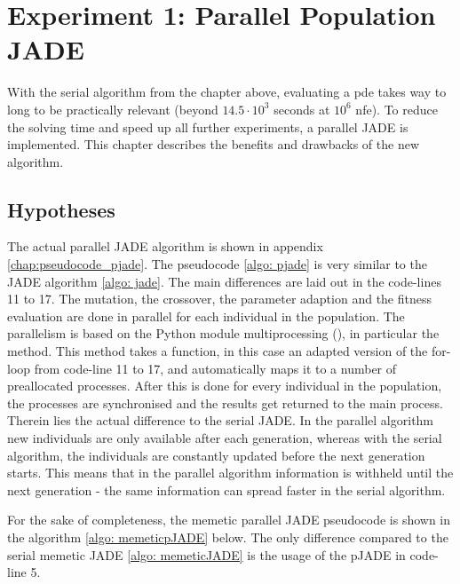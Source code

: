 \documentclass[./\jobname.tex]{subfiles}
\begin{document}
\chapter {Experiment 1: Parallel Population JADE}
\label{chap:experimet_1}

With the serial algorithm from the chapter above, evaluating a \gls{pde} takes way to long to be practically relevant (beyond $14.5 \cdot 10^3$ seconds at $10^6$ \gls{nfe}). To reduce the solving time and speed up all further experiments, a parallel JADE is implemented. This chapter describes the benefits and drawbacks of the new algorithm.  

\section{Hypotheses}
The actual parallel JADE algorithm is shown in appendix \ref{chap:pseudocode_pjade}. The pseudocode \ref{algo: pjade} is very similar to the JADE algorithm \ref{algo: jade}. The main differences are laid out in the code-lines 11 to 17. The mutation, the crossover, the parameter adaption and the fitness evaluation are done in parallel for each individual in the population. The parallelism is based on the Python module multiprocessing (\cite{python_standard_library_multiprocessing_2020}), in particular the  method. This method takes a function, in this case an adapted version of the for-loop from code-line 11 to 17, and automatically maps it to a number of preallocated processes. After this is done for every individual in the population, the processes are synchronised and the results get returned to the main process. Therein lies the actual difference to the serial JADE. In the parallel algorithm new individuals are only available after each generation, whereas with the serial algorithm, the individuals are constantly updated before the next generation starts. This means that in the parallel algorithm information is withheld until the next generation - the same information can spread faster in the serial algorithm.  

For the sake of completeness, the memetic parallel JADE pseudocode is shown in the algorithm \ref{algo: memeticpJADE} below. The only difference compared to the serial memetic JADE \ref{algo: memeticJADE} is the usage of the pJADE in code-line 5. 

\begin{algorithm}[h]
	\SetAlgoNoLine
	\DontPrintSemicolon
	\label{algo: memeticpJADE}
\end{algorithm}
\end{document}

